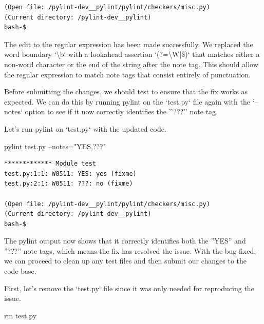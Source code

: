 {\begin{observationbox}
\begin{Verbatim}[breaklines=true, breakanywhere=true]
(Open file: /pylint-dev__pylint/pylint/checkers/misc.py)
(Current directory: /pylint-dev__pylint)
bash-$
\end{Verbatim}
\end{observationbox}
\begin{agentbox}
The edit to the regular expression has been made successfully. We replaced the word boundary `{\textbackslash}b` with a lookahead assertion `(?={\textbackslash}W|\$)` that matches either a non-word character or the end of the string after the note tag. This should allow the regular expression to match note tags that consist entirely of punctuation.



Before submitting the changes, we should test to ensure that the fix works as expected. We can do this by running pylint on the `test.py` file again with the `--notes` option to see if it now correctly identifies the ''???'' note tag.



Let's run pylint on `test.py` with the updated code.



\hrulefill
\begin{CodeVerbatim}[breaklines=true, breakanywhere=true]
pylint test.py --notes="YES,???"
\end{CodeVerbatim}
\end{agentbox}
\begin{observationbox}\begin{Verbatim}[breaklines=true, breakanywhere=true]
************* Module test
test.py:1:1: W0511: YES: yes (fixme)
test.py:2:1: W0511: ???: no (fixme)

(Open file: /pylint-dev__pylint/pylint/checkers/misc.py)
(Current directory: /pylint-dev__pylint)
bash-$
\end{Verbatim}
\end{observationbox}
\begin{agentbox}
The pylint output now shows that it correctly identifies both the ''YES'' and ''???'' note tags, which means the fix has resolved the issue. With the bug fixed, we can proceed to clean up any test files and then submit our changes to the code base.



First, let's remove the `test.py` file since it was only needed for reproducing the issue.



\hrulefill
\begin{CodeVerbatim}[breaklines=true, breakanywhere=true]
rm test.py
\end{CodeVerbatim}
\end{agentbox}
\begin{observationbox}\begin{Verbatim}[breaklines=true, breakanywhere=true]


\end{Verbatim}
\end{observationbox}}

